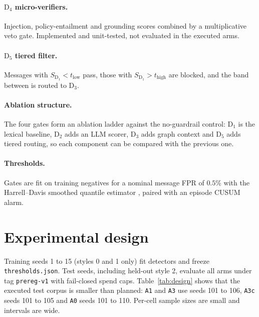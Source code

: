 \documentclass[11pt,a4paper]{article}
\newcommand{\D}[1]{\mathrm{D}_{#1}}
\newcommand{\code}[1]{\texttt{\small #1}}
\begin{document}
\paragraph{$\D{4}$ micro-verifiers.} Injection, policy-entailment and grounding scores combined by a multiplicative veto gate. Implemented and unit-tested, not evaluated in the executed arms.

\paragraph{$\D{5}$ tiered filter.} Messages with $S_{\D1}<t_{\mathrm{low}}$ pass, those with $S_{\D1}>t_{\mathrm{high}}$ are blocked, and the band between is routed to $\D3$.

\paragraph{Ablation structure.} The four gates form an ablation ladder against the no-guardrail control: $\D1$ is the lexical baseline, $\D2$ adds an LLM scorer, $\D3$ adds graph context and $\D5$ adds tiered routing, so each component can be compared with the previous one.

\paragraph{Thresholds.} Gates are fit on training negatives for a nominal message FPR of $0.5\%$ with the Harrell--Davis smoothed quantile estimator \cite{harrell}, paired with an episode CUSUM alarm.

\section{Experimental design}

\begin{table}[t]
\centering\small
\caption{Experimental arms. Planned counts are from the preregistration; executed counts are read from the analysis outputs.}
\label{tab:design}

\end{table}

Training seeds 1 to 15 (styles 0 and 1 only) fit detectors and freeze \code{thresholds.json}. Test seeds, including held-out style 2, evaluate all arms under tag \code{prereg-v1} with fail-closed spend caps. Table~\ref{tab:design} shows that the executed test corpus is smaller than planned: \code{A1} and \code{A3} use seeds 101 to 106, \code{A3c} seeds 101 to 105 and \code{A0} seeds 101 to 110. Per-cell sample sizes are small and intervals are wide.
\end{document}
